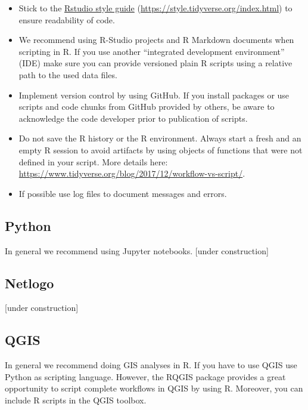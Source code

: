 \documentclass[
  english,
]{article}
\providecommand{\tightlist}{%
  \setlength{\itemsep}{0pt}\setlength{\parskip}{0pt}}
\begin{document}
\begin{itemize}
\tightlist
\item
  Stick to the \href{https://style.tidyverse.org/index.html}{Rstudio
  style guide} (\url{https://style.tidyverse.org/index.html}) to ensure
  readability of code.
\item
  We recommend using R-Studio projects and R Markdown documents when
  scripting in R. If you use another ``integrated development
  environment'' (IDE) make sure you can provide versioned plain R
  scripts using a relative path to the used data files.
\item
  Implement version control by using GitHub. If you install packages or
  use scripts and code chunks from GitHub provided by others, be aware
  to acknowledge the code developer prior to publication of scripts.
\item
  Do not save the R history or the R environment. Always start a fresh
  and an empty R session to avoid artifacts by using objects of
  functions that were not defined in your script. More details here:
  \url{https://www.tidyverse.org/blog/2017/12/workflow-vs-script/}.
\item
  If possible use log files to document messages and errors.
\end{itemize}

\hypertarget{python}{%
\subsection{Python}\label{python}}

In general we recommend using Jupyter notebooks. {[}under
construction{]}

\hypertarget{netlogo}{%
\subsection{Netlogo}\label{netlogo}}

{[}under construction{]}

\hypertarget{qgis}{%
\subsection{QGIS}\label{qgis}}

In general we recommend doing GIS analyses in R. If you have to use QGIS
use Python as scripting language. However, the RQGIS package provides a
great opportunity to script complete workflows in QGIS by using R.
Moreover, you can include R scripts in the QGIS toolbox.
\end{document}
